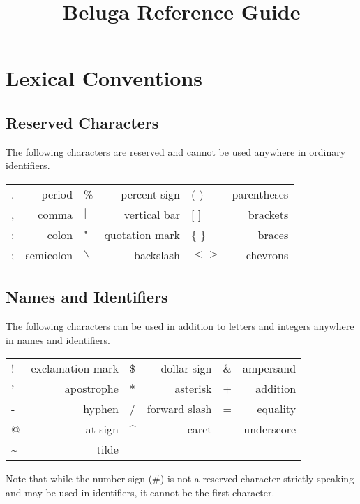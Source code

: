 \documentclass[11pt]{article}
\begin{document}
\title{Beluga Reference Guide}
\author{}
\date{}
\maketitle

\newpage

\section{Lexical Conventions}
\subsection{Reserved Characters}
The following characters are reserved and cannot be used anywhere in ordinary identifiers.
\begin{center}
\begin{tabular}{ | l r | l r | l r }
  . & period & \% & percent sign &  ( )  & parentheses \\
 , & comma & $\vert$ & vertical bar & [ ] & brackets\\
: & colon &  " & quotation mark  & \{ \} & braces  \\
; & semicolon & $\backslash$ & backslash  & $< >$ & chevrons  \\
\end{tabular}
\end{center}

\subsection{Names and Identifiers}
The following characters can be used in addition to letters and integers anywhere in names and identifiers.
\begin{center}
\begin{tabular}{ | l r | l r | l r }
 ! & exclamation mark & \$ & dollar sign & \& & ampersand\\
' & apostrophe &  * & asterisk  & + & addition \\
- & hyphen & / & forward slash  & = & equality  \\
@ & at sign & \^{} & caret  &  \_  & underscore  \\
\~{} & tilde &\\
\end{tabular}
\end{center}
Note that while the number sign (\#) is not a reserved  character strictly speaking and may be used in identifiers, it cannot be the first character.
\end{document}
